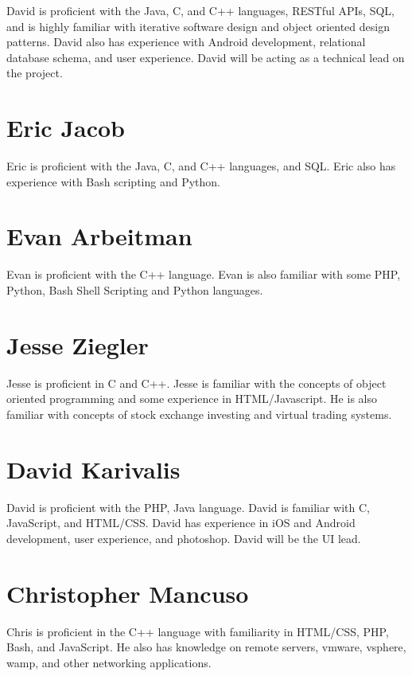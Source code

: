 \documentclass[11pt,letterpaper,oneside]{memoir}
\begin{document}
David is proficient with the Java, C, and C++ languages, RESTful APIs, SQL, and is
highly familiar with iterative software design and object oriented design patterns.
David also has experience with Android development, relational database schema, and
user experience.  David will be acting as a technical lead on the project.

\section{Eric Jacob}

Eric is proficient with the Java, C, and C++ languages, and SQL.  Eric also has
experience with Bash scripting and Python.

\section{Evan Arbeitman}

Evan is proficient with the C++ language. Evan is also familiar with some PHP, Python,
Bash Shell Scripting and Python languages.

\section{Jesse Ziegler}

Jesse is proficient in C and C++. Jesse is familiar with the concepts of object
oriented programming and some experience in HTML/Javascript. He is also familiar
with concepts of stock exchange investing and virtual trading systems.

\section{David Karivalis}

David is proficient with the PHP, Java language. David is familiar with C, JavaScript, and HTML/CSS.
David has experience in iOS and Android development, user experience, and photoshop.  David will be
the UI lead.

\section{Christopher Mancuso}

Chris is proficient in the C++ language with familiarity in HTML/CSS, PHP, Bash, and JavaScript. He
also has knowledge on remote servers, vmware, vsphere, wamp, and other networking applications.

\end{document}
